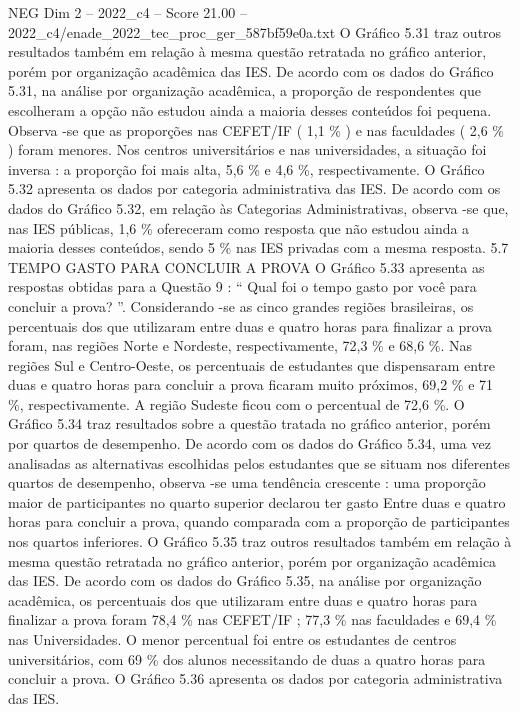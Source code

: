 \begin{textsample}{NEG Dim 2 – 2022\_c4 – Score 21.00 – 2022\_c4/enade\_2022\_tec\_proc\_ger\_587bf59e0a.txt}
O Gráfico 5.31 traz outros resultados também em relação à mesma questão retratada no gráfico anterior, porém por organização acadêmica das IES.
De acordo com os dados do Gráfico 5.31, na análise por organização acadêmica, a proporção de respondentes que escolheram a opção não estudou ainda a maioria desses conteúdos foi pequena.
Observa -se que as proporções nas CEFET/IF ( 1,1 \% ) e nas faculdades ( 2,6 \% ) foram menores.
Nos centros universitários e nas universidades, a situação foi inversa : a proporção foi mais alta, 5,6 \% e 4,6 \%, respectivamente.
O Gráfico 5.32 apresenta os dados por categoria administrativa das IES.
De acordo com os dados do Gráfico 5.32, em relação às Categorias Administrativas, observa -se que, nas IES públicas, 1,6 \% ofereceram como resposta que não estudou ainda a maioria desses conteúdos, sendo 5 \% nas IES privadas com a mesma resposta. 5.7 TEMPO GASTO PARA CONCLUIR A PROVA O Gráfico 5.33 apresenta as respostas obtidas para a Questão 9 : “ Qual foi o tempo gasto por você para concluir a prova? ”.
Considerando -se as cinco grandes regiões brasileiras, os percentuais dos que utilizaram entre duas e quatro horas para finalizar a prova foram, nas regiões Norte e Nordeste, respectivamente, 72,3 \% e 68,6 \%.
Nas regiões Sul e Centro-Oeste, os percentuais de estudantes que dispensaram entre duas e quatro horas para concluir a prova ficaram muito próximos, 69,2 \% e 71 \%, respectivamente.
A região Sudeste ficou com o percentual de 72,6 \%.
O Gráfico 5.34 traz resultados sobre a questão tratada no gráfico anterior, porém por quartos de desempenho.
De acordo com os dados do Gráfico 5.34, uma vez analisadas as alternativas escolhidas pelos estudantes que se situam nos diferentes quartos de desempenho, observa -se uma tendência crescente : uma proporção maior de participantes no quarto superior declarou ter gasto Entre duas e quatro horas para concluir a prova, quando comparada com a proporção de participantes nos quartos inferiores.
O Gráfico 5.35 traz outros resultados também em relação à mesma questão retratada no gráfico anterior, porém por organização acadêmica das IES.
De acordo com os dados do Gráfico 5.35, na análise por organização acadêmica, os percentuais dos que utilizaram entre duas e quatro horas para finalizar a prova foram 78,4 \% nas CEFET/IF ; 77,3 \% nas faculdades e 69,4 \% nas Universidades.
O menor percentual foi entre os estudantes de centros universitários, com 69 \% dos alunos necessitando de duas a quatro horas para concluir a prova.
O Gráfico 5.36 apresenta os dados por categoria administrativa das IES.

\end{textsample}
